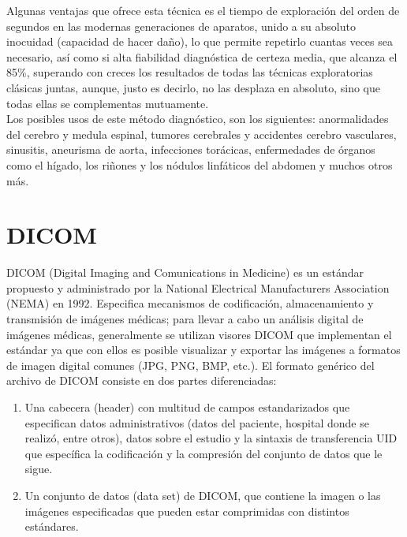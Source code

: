 \documentclass[12pt]{report}
\begin{document}
Algunas ventajas que ofrece esta técnica es el tiempo de exploración del orden de segundos en las modernas generaciones de aparatos, unido a su absoluto inocuidad (capacidad de hacer daño), lo que permite repetirlo cuantas veces sea necesario, así como si alta fiabilidad diagnóstica de certeza media, que alcanza el 85\%, superando con creces los resultados de todas las técnicas exploratorias
clásicas juntas, aunque, justo es decirlo, no las desplaza en absoluto, sino que todas ellas se complementas mutuamente.\\
Los posibles usos de este método diagnóstico, son los siguientes: anormalidades del cerebro y medula espinal, tumores cerebrales y accidentes cerebro vasculares, sinusitis, aneurisma de aorta, infecciones torácicas, enfermedades de órganos como el hígado, los riñones y los nódulos linfáticos del abdomen y muchos otros más.\\

\section{DICOM}
DICOM (Digital Imaging and Comunications in Medicine) es un estándar propuesto y administrado por la National Electrical Manufacturers Association (NEMA) en 1992. Especifica mecanismos de codificación, almacenamiento y transmisión de imágenes médicas; para llevar a cabo un análisis digital de imágenes médicas, generalmente se utilizan visores DICOM que implementan el estándar ya que con ellos es posible visualizar y exportar las imágenes a formatos de imagen digital comunes (JPG, PNG, BMP, etc.). 
El formato genérico del archivo de DICOM consiste en dos partes diferenciadas:
\begin{enumerate}
\item Una cabecera (header) con multitud de campos estandarizados que especifican datos administrativos (datos del paciente, hospital donde se realizó, entre otros), datos sobre el estudio y la sintaxis de transferencia UID  que específica la codificación y la compresión del conjunto de datos que le sigue.
\item Un conjunto de datos (data set) de DICOM, que contiene la imagen o las imágenes especificadas que pueden estar comprimidas con distintos estándares.
\end{enumerate}
\end{document}

